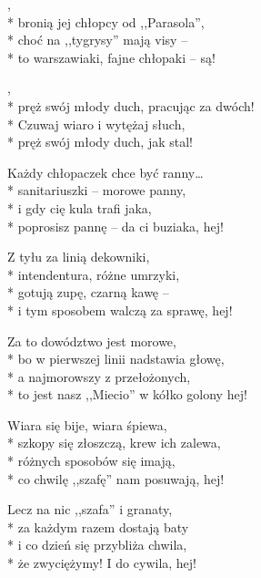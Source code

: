 \begin{lyrics}[longestline={to jest nasz ,,Miecio'' w kółko golony hej!}]

,\\*
bronią jej chłopcy od ,,Parasola'',\\*
choć na ,,tygrysy'' mają visy --\\*
to warszawiaki, fajne chłopaki -- są!

\begin{chorus}
,\\*
pręż swój młody duch, pracując za dwóch!\\*
Czuwaj wiaro i wytężaj słuch,\\*
pręż swój młody duch, jak stal!
\end{chorus}

Każdy chłopaczek chce być ranny\ldots\\*
sanitariuszki -- morowe panny,\\*
i gdy cię kula trafi jaka,\\*
poprosisz pannę -- da ci buziaka, hej!

\chorusref

Z tyłu za linią dekowniki,\\*
intendentura, różne umrzyki,\\*
gotują zupę, czarną kawę --\\*
i tym sposobem walczą za sprawę, hej!

\chorusref

\breaklyrics

Za to dowództwo jest morowe,\\*
bo w pierwszej linii nadstawia głowę,\\*
a najmorowszy z przełożonych,\\*
to jest nasz ,,Miecio'' w kółko golony hej!

\chorusref

Wiara się bije, wiara śpiewa,\\*
szkopy się złoszczą, krew ich zalewa,\\*
różnych sposobów się imają,\\*
co chwilę ,,szafę'' nam posuwają, hej!

\chorusref

Lecz na nic ,,szafa'' i granaty,\\*
za każdym razem dostają baty\\*
i co dzień się przybliża chwila,\\*
że zwyciężymy! I do cywila, hej!

\chorusref
\end{lyrics}



